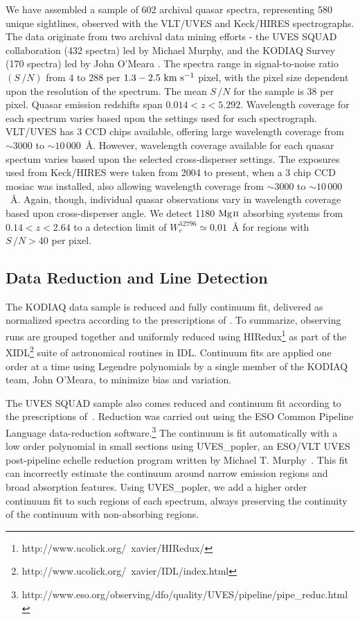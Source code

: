 \documentclass[iop,apj,numberedappendix,appendixfloats,twocolappendix]{emulateapj}
\begin{document}
We have assembled a sample of 602 archival quasar spectra, representing 580 unique sightlines, observed with the VLT/UVES and Keck/HIRES spectrographs. The data originate from two archival data mining efforts - the UVES SQUAD collaboration (432 spectra) led by Michael Murphy, and the KODIAQ Survey (170 spectra) led by John O'Meara \citep{OMeara2015}. The spectra range in signal-to-noise ratio $(S\,/N)$ from $4$ to $288$ per $1.3 - 2.5~\mathrm{\hbox{km~s$^{-1}$}}$ pixel, with the pixel size dependent upon the resolution of the spectrum. The mean $S\,/N$ for the sample is $38$ per pixel. Quasar emission redshifts span $0.014 < z < 5.292$. Wavelength coverage for each spectrum varies based upon the settings used for each spectrograph. VLT/UVES has 3 CCD chips available, offering large wavelength coverage from $\sim 3000$ to $\sim10\,000$~{\AA}. However, wavelength coverage available for each quasar spectum varies based upon the selected cross-disperser settings. The exposures used from Keck/HIRES were taken from 2004 to present, when a 3 chip CCD mosiac was installed, also allowing wavelength coverage from  $\sim 3000$ to $\sim10\,000$~{\AA}. Again, though, individual quasar observations vary in wavelength coverage based upon cross-disperser angle. We detect 1180 ${\hbox{{\rm Mg}\kern 0.1em{\sc ii}}}$ absorbing systems from $0.14 < z < 2.64$ to a detection limit of $W_r^{\lambda2796} \simeq 0.01$~{\AA} for regions with $S\,/N > 40$ per pixel.


\subsection{Data Reduction and Line Detection}
\label{sec:detection}

The KODIAQ data sample is reduced and fully continuum fit, delivered as normalized spectra according to the prescriptions of \cite{OMeara2015}. To summarize, observing runs are grouped together and uniformly reduced using HIRedux\footnote{http://www.ucolick.org/~xavier/HIRedux/} as part of the XIDL\footnote{http://www.ucolick.org/~xavier/IDL/index.html} suite of astronomical routines in IDL. Continuum fits are applied one order at a time using Legendre polynomials by a single member of the KODIAQ team, John O'Meara, to minimize bias and variation.

The UVES SQUAD sample also comes reduced and continuum fit according to the prescriptions of~\cite{King2012,Bagdonaite2014,Murphy2016,Murphyprep}. Reduction was carried out using the ESO Common Pipeline Language data-reduction software.\footnote{http://www.eso.org/observing/dfo/quality/UVES/pipeline/pipe\_reduc.html} The continuum is fit automatically with a low order polynomial in small sections using UVES\_popler, an ESO/VLT UVES post-pipeline echelle reduction program written by Michael T. Murphy~\citep{MurphyPOPLER}. This fit can incorrectly estimate the continuum around narrow emission regions and broad absorption features. Using UVES\_popler, we add a higher order continuum fit to such regions of each spectrum, always preserving the continuity of the continuum with non-absorbing regions.
\end{document}
